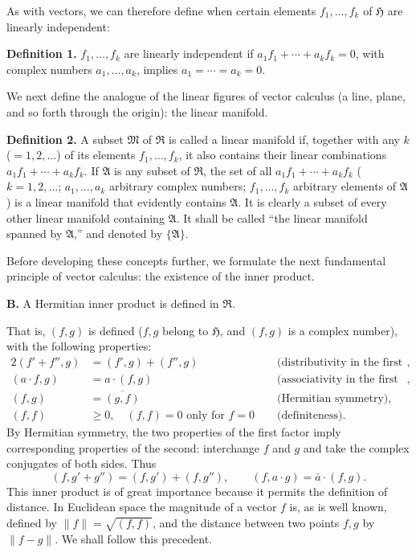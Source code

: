 \documentclass[fontsize=13pt,twoside,openany,headings=normal,parskip=false,bookmarkpackage=false,DIV=calc]{scrbook}
\begin{document}
As with vectors, we can therefore define when certain elements $f_1,\ldots,f_k$ of $\mathfrak{H}$ are linearly independent:

\leavevmode{}\textbf{Definition 1.}\label{def:II.1} $f_1,\ldots,f_k$ are linearly independent if $a_1f_1+\cdots+a_kf_k=0$, with complex numbers $a_1,\ldots,a_k$, implies $a_1=\cdots=a_k=0$.

We next define the analogue of the linear figures of vector calculus (a line, plane, and so forth through the origin): the linear manifold.

\leavevmode{}\textbf{Definition 2.}\label{def:II.2} A subset $\mathfrak{M}$ of $\mathfrak{R}$ is called a linear manifold if, together with any $k$ ($=1,2,\ldots$) of its elements $f_1,\ldots,f_k$, it also contains their linear combinations $a_1f_1+\cdots+a_kf_k$. If $\mathfrak{A}$ is any subset of $\mathfrak{R}$, the set of all $a_1f_1+\cdots+a_kf_k$ ($k=1,2,\ldots$; $a_1,\ldots,a_k$ arbitrary complex numbers; $f_1,\ldots,f_k$ arbitrary elements of $\mathfrak{A}$) is a linear manifold that evidently contains $\mathfrak{A}$. It is clearly a subset of every other linear manifold containing $\mathfrak{A}$.
\hypertarget{origpage-21}{}%
It shall be called ``the linear manifold spanned by $\mathfrak{A}$,'' and denoted by $\{\mathfrak{A}\}$.

Before developing these concepts further, we formulate the next fundamental principle of vector calculus: the existence of the inner product.

\leavevmode{}\textbf{B.}\label{ax:II.B} A Hermitian inner product is defined in $\mathfrak{R}$.

That is, $(f,g)$ is defined ($f,g$ belong to $\mathfrak{H}$, and $(f,g)$ is a complex number), with the following properties:
\begin{alignat*}{2}
(f'+f'',g)&=(f',g)+(f'',g)&\quad &\text{(distributivity in the first factor)},\\
(a\cdot f,g)&=a\cdot(f,g)&\quad &\text{(associativity in the first factor)},\\
(f,g)&=\overline{(g,f)}&\quad &\text{(Hermitian symmetry)},\\
(f,f)&\geq0,\quad (f,f)=0\text{ only for }f=0
&\quad &\text{(definiteness)}.
\end{alignat*}
By Hermitian symmetry, the two properties of the first factor imply corresponding properties of the second: interchange $f$ and $g$ and take the complex conjugates of both sides. Thus
\[
(f,g'+g'')=(f,g')+(f,g''),\qquad
(f,a\cdot g)=\bar a\cdot(f,g).
\]
This inner product is of great importance because it permits the definition of distance. In Euclidean space the magnitude of a vector $f$ is, as is well known, defined by $\|f\|=\sqrt{(f,f)}$, and the distance between two points $f,g$ by $\|f-g\|$. We shall follow this precedent.
\end{document}
